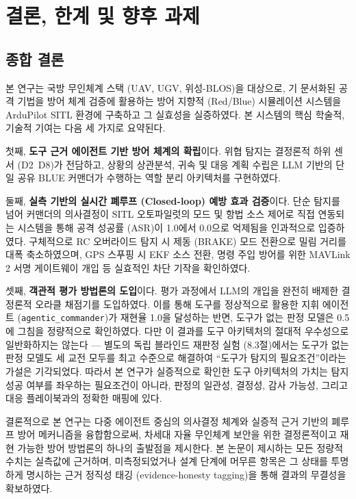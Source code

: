 \section{결론, 한계 및 향후 과제}

\subsection{종합 결론}

본 연구는 국방 무인체계 스택 (UAV, UGV, 위성-BLOS)을 대상으로, 기 문서화된 공격 기법을 방어 체계 검증에 활용하는 방어 지향적 (Red/Blue) 시뮬레이션 시스템을 ArduPilot SITL 환경에 구축하고 그 실효성을 실증하였다. 본 시스템의 핵심 학술적, 기술적 기여는 다음 세 가지로 요약된다.

첫째, \textbf{도구 근거 에이전트 기반 방어 체계의 확립}이다. 위협 탐지는 결정론적 하위 센서 (D2~D8)가 전담하고, 상황의 상관분석, 귀속 및 대응 계획 수립은 LLM 기반의 단일 공유 BLUE 커맨더가 수행하는 역할 분리 아키텍처를 구현하였다.

둘째, \textbf{실측 기반의 실시간 폐루프 (Closed-loop) 예방 효과 검증}이다. 단순 탐지를 넘어 커맨더의 의사결정이 SITL 오토파일럿의 모드 및 항법 소스 제어로 직접 연동되는 시스템을 통해 공격 성공률 (ASR)이 1.0에서 0.0으로 억제됨을 인과적으로 입증하였다. 구체적으로 RC 오버라이드 탐지 시 제동 (BRAKE) 모드 전환으로 밀림 거리를 대폭 축소하였으며, GPS 스푸핑 시 EKF 소스 전환, 명령 주입 방어를 위한 MAVLink 2 서명 게이트웨이 개입 등 실효적인 차단 기작을 확인하였다.

셋째, \textbf{객관적 평가 방법론의 도입}이다. 평가 과정에서 LLM의 개입을 완전히 배제한 결정론적 오라클 채점기를 도입하였다. 이를 통해 도구를 정상적으로 활용한 지휘 에이전트 (\texttt{agentic\_commander})가 재현율 1.0을 달성하는 반면, 도구가 없는 판정 모델은 0.5에 그침을 정량적으로 확인하였다. 다만 이 결과를 도구 아키텍처의 절대적 우수성으로 일반화하지는 않는다 --- 별도의 독립 블라인드 재판정 실험 (8.3절)에서는 도구가 없는 판정 모델도 세 교전 모두를 최고 수준으로 해결하여 ``도구가 탐지의 필요조건''이라는 가설은 기각되었다. 따라서 본 연구가 실증적으로 확인한 도구 아키텍처의 가치는 탐지 성공 여부를 좌우하는 필요조건이 아니라, 판정의 일관성, 결정성, 감사 가능성, 그리고 대응 플레이북과의 정확한 매핑에 있다.

결론적으로 본 연구는 다중 에이전트 중심의 의사결정 체계와 실증적 근거 기반의 폐루프 방어 메커니즘을 융합함으로써, 차세대 자율 무인체계 보안을 위한 결정론적이고 재현 가능한 방어 방법론의 하나의 출발점을 제시한다. 본 논문이 제시하는 모든 정량적 수치는 실측값에 근거하며, 미측정되었거나 설계 단계에 머무른 항목은 그 상태를 투명하게 명시하는 근거 정직성 태깅 (evidence-honesty tagging)을 통해 결과의 무결성을 확보하였다.

